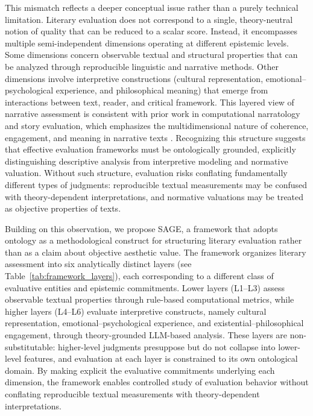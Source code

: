 This mismatch reflects a deeper conceptual issue rather than a purely technical limitation. Literary evaluation does not correspond to a single, theory-neutral notion of quality that can be reduced to a scalar score. Instead, it encompasses multiple semi-independent dimensions operating at different epistemic levels. Some dimensions concern observable textual and structural properties that can be analyzed through reproducible linguistic and narrative methods. Other dimensions involve interpretive constructions (cultural representation, emotional–psychological experience, and philosophical meaning) that emerge from interactions between text, reader, and critical framework. This layered view of narrative assessment is consistent with prior work in computational narratology and story evaluation, which emphasizes the multidimensional nature of coherence, engagement, and meaning in narrative texts \cite{graesser2004coh,callan2023interesting,yang2024makes}. Recognizing this structure suggests that effective evaluation frameworks must be ontologically grounded, explicitly distinguishing descriptive analysis from interpretive modeling and normative valuation. Without such structure, evaluation risks conflating fundamentally different types of judgments: reproducible textual measurements may be confused with theory-dependent interpretations, and normative valuations may be treated as objective properties of texts.

Building on this observation, we propose SAGE, a framework that adopts ontology as a methodological construct for structuring literary evaluation rather than as a claim about objective aesthetic value. The framework organizes literary assessment into six analytically distinct layers (see Table~\ref{tab:framework_layers}), each corresponding to a different class of evaluative entities and epistemic commitments. Lower layers (L1–L3) assess observable textual properties through rule-based computational metrics, while higher layers (L4–L6) evaluate interpretive constructs, namely cultural representation, emotional–psychological experience, and existential–philosophical engagement, through theory-grounded LLM-based analysis. These layers are non-substitutable: higher-level judgments presuppose but do not collapse into lower-level features, and evaluation at each layer is constrained to its own ontological domain. By making explicit the evaluative commitments underlying each dimension, the framework enables controlled study of evaluation behavior without conflating reproducible textual measurements with theory-dependent interpretations.

